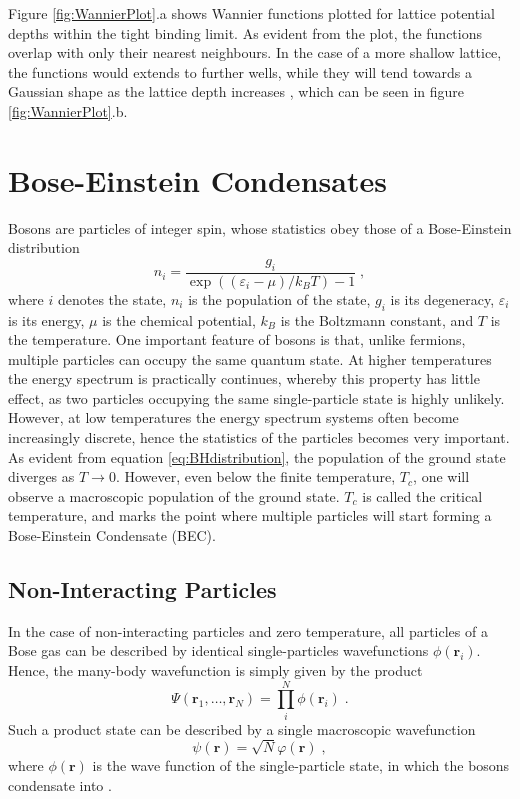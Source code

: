 Figure \ref{fig:WannierPlot}.a shows Wannier functions plotted for lattice potential depths within the tight binding limit. As evident from the plot, the functions overlap with only their nearest neighbours. In the case of a more shallow lattice, the functions would extends to further wells, while they will tend towards a Gaussian shape as the lattice depth increases \cite{greiner}, which can be seen in figure \ref{fig:WannierPlot}.b.



\section{Bose-Einstein Condensates}

Bosons are particles of integer spin, whose statistics obey those of a Bose-Einstein distribution
\begin{equation}
	n_i = \frac{g_i}{\exp \left( \left( \varepsilon_i -\mu \right) / k_B T \right) - 1} \; , \label{eq:BHdistribution}
\end{equation} 
where $i$ denotes the state, $n_i$ is the population of the state, $g_i$ is its degeneracy, $\varepsilon_i$ is its energy, $\mu$ is the chemical potential, $k_B$ is the Boltzmann constant, and $T$ is the temperature. One important feature of bosons is that, unlike fermions, multiple particles can occupy the same quantum state. At higher temperatures the energy spectrum is practically continues, whereby this property has little effect, as two particles occupying the same single-particle state is highly unlikely. However, at low temperatures the energy spectrum systems often become increasingly discrete, hence the statistics of the particles becomes very important. As evident from equation \eqref{eq:BHdistribution}, the population of the ground state diverges as $T \to 0$. However, even below the finite temperature, $T_c$, one will observe a macroscopic population of the ground state. $T_c$ is called the critical temperature, and marks the point where multiple particles will start forming a Bose-Einstein Condensate (BEC). \cite{pethick2002bose}

\subsection{Non-Interacting Particles}
In the case of non-interacting particles and zero temperature, all particles of a Bose gas can be described by identical single-particles wavefunctions $\phi (\boldsymbol{r}_i)$. Hence, the many-body wavefunction is simply given by the product 
\begin{equation}
	\Psi (\boldsymbol{r}_1 , \ldots , \boldsymbol{r}_N) = \prod_{i}^{N} \phi (\boldsymbol{r}_i) \; .
\end{equation}
Such a product state can be described by a single macroscopic wavefunction
\begin{equation}
	\psi (\boldsymbol{r}) = \sqrt{N} \varphi (\boldsymbol{r}) \; , \label{eq:psi_NIBEC}
\end{equation}
where $\phi (\boldsymbol{r})$ is the wave function of the single-particle state, in which the bosons condensate into \cite{PenroseOnsager}.

